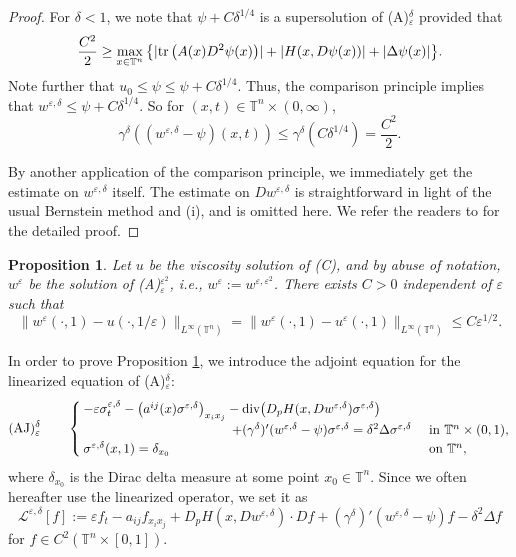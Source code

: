 \documentclass[12pt,reqno]{amsart}
\theoremstyle{plain}
\newtheorem{prop}[thm]{Proposition}
\theoremstyle{remark}
\numberwithin{equation}{section}
\begin{document}
\begin{proof}

For $\delta<1$, we note that $\psi+C\delta^{1/4}$ is a supersolution of (A)$_{\varepsilon}^{\delta}$ provided that
$$
\frac{C^2}{2} \geq  \max_{x\in{\mathbb{T}}^n}\big\{
 |{{\rm tr}\,}\big(A(x)D^2\psi(x)\big)|+|H(x,D\psi(x))|+|{\Delta} \psi(x)|
 \big\}.
$$
Note further that $u_0 \leq \psi \leq \psi+C\delta^{1/4}$. Thus, the comparison principle implies that $w^{{\varepsilon},{\delta}} \leq \psi+C\delta^{1/4}$. So for $(x,t) \in {\mathbb{T}^{n}\times(0,\infty)}$,
$$
{\gamma}^{\delta}((w^{{\varepsilon},{\delta}}-\psi)(x,t)) \leq {\gamma}^\delta(C\delta^{1/4})=\frac{C^2}{2}.
$$

By another application of the comparison principle, we immediately get the estimate on $w^{{\varepsilon},{\delta}}$ itself. The estimate on $Dw^{{\varepsilon},{\delta}}$ is straightforward in light of the usual Bernstein method and (i), and is omitted here. We refer the readers to \cite{CGT2} for the detailed proof.
\end{proof}

\begin{prop}\label{prop:stability}
Let $u$ be the viscosity solution of {\rm(C)}, and
by abuse of notation, $w^{\varepsilon}$ be the solution of {\rm(A)}$_{\varepsilon}^{{\varepsilon}^2}$,
i.e., $w^{\varepsilon}:=w^{{\varepsilon},{\varepsilon}^2}$.
There exists $C>0$ independent of ${\varepsilon}$ such that
\[
\|w^{\varepsilon}(\cdot,1)-u(\cdot,1/{\varepsilon})\|_{{L^{\infty}}({\mathbb{T}}^n)}=
\|w^{\varepsilon}(\cdot,1)-u^{\varepsilon}(\cdot,1)\|_{{L^{\infty}}({\mathbb{T}}^n)}\le C{\varepsilon}^{1/2}. 
\]
\end{prop}

In order to prove Proposition \ref{prop:stability}, we introduce 
the adjoint equation for the linearized equation of (A)$_{\varepsilon}^{\delta}$: 
\begin{equation} \notag
{\rm (AJ)_{\varepsilon}^{\delta}} \qquad 
\begin{cases}
-{\varepsilon} {\sigma}^{{\varepsilon},{\delta}}_t -\big(a^{ij}(x){\sigma}^{{\varepsilon},{\delta}}\big)_{x_i x_j}
-\text{div}\big(D_p H(x,Dw^{{\varepsilon},{\delta}}) {\sigma}^{{\varepsilon},{\delta}}\big) \\
\hspace*{4cm}+({\gamma}^{\delta})'(w^{{\varepsilon},{\delta}}-\psi){\sigma}^{{\varepsilon},{\delta}} 
={\delta}^2{\Delta}{\sigma}^{{\varepsilon},{\delta}} & \text{ in }{\mathbb{T}}^n \times (0,1),  \\
{\sigma}^{{\varepsilon},{\delta}}(x,1)={\delta}_{x_0}  & \text{ on } {\mathbb{T}}^{n},
\end{cases}
\end{equation} 
where  ${\delta}_{x_0}$ is the Dirac delta measure at some point $x_0 \in {\mathbb{T}}^n$. 
Since we often hereafter use the linearized operator, we set it as
\[
{\mathcal{L}}^{{\varepsilon},{\delta}}[f]:=
{\varepsilon} f_t-a_{ij}f_{x_ix_j}+D_pH(x,Dw^{{\varepsilon},{\delta}})\cdot Df+
({\gamma}^{\delta})'(w^{{\varepsilon},{\delta}}-\psi)f-{\delta}^2{\Delta} f 
\]
for $f\in C^2({\mathbb{T}}^n\times[0,1])$. 
\end{document}
